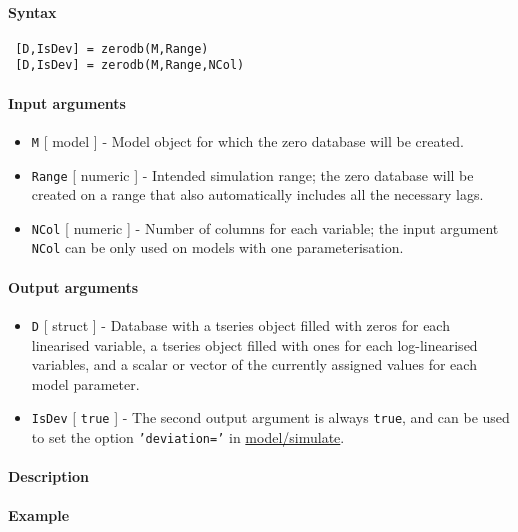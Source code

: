


	\paragraph{Syntax}
 
 \begin{verbatim}
 [D,IsDev] = zerodb(M,Range)
 [D,IsDev] = zerodb(M,Range,NCol)
 \end{verbatim}
 
 \paragraph{Input arguments}
 
 \begin{itemize}
 \item
   \texttt{M} {[} model {]} - Model object for which the zero database
   will be created.
 \item
   \texttt{Range} {[} numeric {]} - Intended simulation range; the zero
   database will be created on a range that also automatically includes
   all the necessary lags.
 \item
   \texttt{NCol} {[} numeric {]} - Number of columns for each variable;
   the input argument \texttt{NCol} can be only used on models with one
   parameterisation.
 \end{itemize}
 
 \paragraph{Output arguments}
 
 \begin{itemize}
 \item
   \texttt{D} {[} struct {]} - Database with a tseries object filled with
   zeros for each linearised variable, a tseries object filled with ones
   for each log-linearised variables, and a scalar or vector of the
   currently assigned values for each model parameter.
 \item
   \texttt{IsDev} {[} \texttt{true} {]} - The second output argument is
   always \texttt{true}, and can be used to set the option
   \texttt{'deviation='} in \url{model/simulate}.
 \end{itemize}
 
 \paragraph{Description}
 
 \paragraph{Example}


